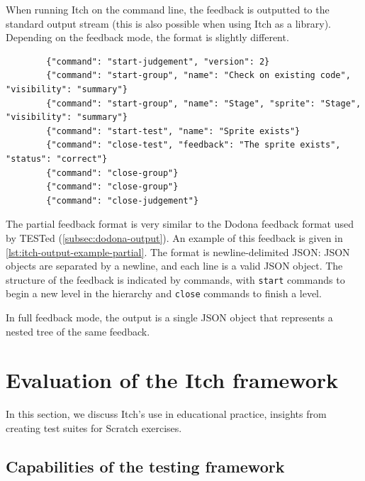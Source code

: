 \documentclass[../main]{subfiles}
\begin{document}
When running Itch on the command line, the feedback is outputted to the standard output stream (this is also possible when using Itch as a library).
Depending on the feedback mode, the format is slightly different.

\begin{listing}
    \begin{verbatim}
        {"command": "start-judgement", "version": 2}
        {"command": "start-group", "name": "Check on existing code", "visibility": "summary"}
        {"command": "start-group", "name": "Stage", "sprite": "Stage", "visibility": "summary"}
        {"command": "start-test", "name": "Sprite exists"}
        {"command": "close-test", "feedback": "The sprite exists", "status": "correct"}
        {"command": "close-group"}
        {"command": "close-group"}
        {"command": "close-judgement"}
    \end{verbatim}
    \caption{Example of the output generated by Itch for a test suite with two nested groups, with one test. Note the similarity to \cref{lst:tested-output-example}.}\label{lst:itch-output-example-partial}
\end{listing}

The partial feedback format is very similar to the Dodona feedback format used by TESTed (\cref{subsec:dodona-output}).
An example of this feedback is given in \cref{lst:itch-output-example-partial}.
The format is newline-delimited JSON: JSON objects are separated by a newline, and each line is a valid JSON object.
The structure of the feedback is indicated by commands, with \texttt{start} commands to begin a new level in the hierarchy and \texttt{close} commands to finish a level.

In full feedback mode, the output is a single JSON object that represents a nested tree of the same feedback.

\section{Evaluation of the Itch framework}\label{sec:itch-evaluation}

In this section, we discuss Itch's use in educational practice, insights from creating test suites for Scratch exercises.

\subsection{Capabilities of the testing framework}\label{subsec:capabilities-of-the-testing-framework}
\end{document}
